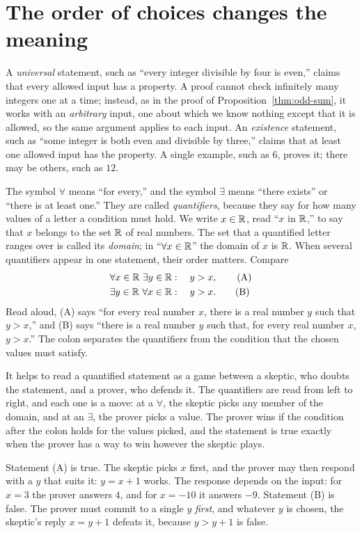 \section{The order of choices changes the meaning}\label{ch02:sec:quantifiers}
A \emph{universal} statement, such as ``every integer divisible by four is even,'' claims that every allowed input has a property. A proof cannot check infinitely many integers one at a time; instead, as in the proof of Proposition~\ref{thm:odd-sum}, it works with an \emph{arbitrary} input, one about which we know nothing except that it is allowed, so the same argument applies to each input. An \emph{existence} statement, such as ``some integer is both even and divisible by three,'' claims that at least one allowed input has the property. A single example, such as $6$, proves it; there may be others, such as $12$.

The symbol $\forall$ means ``for every,'' and the symbol $\exists$ means ``there exists'' or ``there is at least one.'' They are called \emph{quantifiers}, because they say for how many values of a letter a condition must hold. We write $x\in\mathbb R$, read ``$x$ in $\mathbb R$,'' to say that $x$ belongs to the set $\mathbb R$ of real numbers. The set that a quantified letter ranges over is called its \emph{domain}; in ``$\forall x\in\mathbb R$'' the domain of $x$ is $\mathbb R$. When several quantifiers appear in one statement, their order matters. Compare
\begin{align*}
&\forall x\in\mathbb R\ \exists y\in\mathbb R:\quad y>x,\tag{A}\\
&\exists y\in\mathbb R\ \forall x\in\mathbb R:\quad y>x.\tag{B}
\end{align*}
Read aloud, (A) says ``for every real number $x$, there is a real number $y$ such that $y>x$,'' and (B) says ``there is a real number $y$ such that, for every real number $x$, $y>x$.'' The colon separates the quantifiers from the condition that the chosen values must satisfy.

It helps to read a quantified statement as a game between a skeptic, who doubts the statement, and a prover, who defends it. The quantifiers are read from left to right, and each one is a move: at a $\forall$, the skeptic picks any member of the domain, and at an $\exists$, the prover picks a value. The prover wins if the condition after the colon holds for the values picked, and the statement is true exactly when the prover has a way to win however the skeptic plays.

Statement (A) is true. The skeptic picks $x$ first, and the prover may then respond with a $y$ that suits it: $y=x+1$ works. The response depends on the input: for $x=3$ the prover answers $4$, and for $x=-10$ it answers $-9$. Statement (B) is false. The prover must commit to a single $y$ \emph{first}, and whatever $y$ is chosen, the skeptic's reply $x=y+1$ defeats it, because $y>y+1$ is false.

